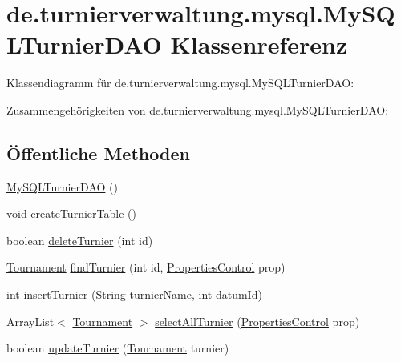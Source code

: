 \hypertarget{classde_1_1turnierverwaltung_1_1mysql_1_1_my_s_q_l_turnier_d_a_o}{}\section{de.\+turnierverwaltung.\+mysql.\+My\+S\+Q\+L\+Turnier\+D\+AO Klassenreferenz}
\label{classde_1_1turnierverwaltung_1_1mysql_1_1_my_s_q_l_turnier_d_a_o}


Klassendiagramm für de.\+turnierverwaltung.\+mysql.\+My\+S\+Q\+L\+Turnier\+D\+AO\+:


Zusammengehörigkeiten von de.\+turnierverwaltung.\+mysql.\+My\+S\+Q\+L\+Turnier\+D\+AO\+:
\subsection*{Öffentliche Methoden}
\begin{DoxyCompactItemize}
\item 
\hyperlink{classde_1_1turnierverwaltung_1_1mysql_1_1_my_s_q_l_turnier_d_a_o_a7ce6e55341d08923233e23a51085e854}{My\+S\+Q\+L\+Turnier\+D\+AO} ()
\item 
void \hyperlink{classde_1_1turnierverwaltung_1_1mysql_1_1_my_s_q_l_turnier_d_a_o_a453121755c3f43e502c0245ece4085ca}{create\+Turnier\+Table} ()
\item 
boolean \hyperlink{classde_1_1turnierverwaltung_1_1mysql_1_1_my_s_q_l_turnier_d_a_o_a15a4917269636ac58e5228d384f67ba5}{delete\+Turnier} (int id)
\item 
\hyperlink{classde_1_1turnierverwaltung_1_1model_1_1_tournament}{Tournament} \hyperlink{classde_1_1turnierverwaltung_1_1mysql_1_1_my_s_q_l_turnier_d_a_o_ae2eda2176964852742ee104462a895a8}{find\+Turnier} (int id, \hyperlink{classde_1_1turnierverwaltung_1_1control_1_1_properties_control}{Properties\+Control} prop)
\item 
int \hyperlink{classde_1_1turnierverwaltung_1_1mysql_1_1_my_s_q_l_turnier_d_a_o_af2755099486832444fc54f9deaffa96d}{insert\+Turnier} (String turnier\+Name, int datum\+Id)
\item 
Array\+List$<$ \hyperlink{classde_1_1turnierverwaltung_1_1model_1_1_tournament}{Tournament} $>$ \hyperlink{classde_1_1turnierverwaltung_1_1mysql_1_1_my_s_q_l_turnier_d_a_o_a2c69011060b143c1f355420147e57fae}{select\+All\+Turnier} (\hyperlink{classde_1_1turnierverwaltung_1_1control_1_1_properties_control}{Properties\+Control} prop)
\item 
boolean \hyperlink{classde_1_1turnierverwaltung_1_1mysql_1_1_my_s_q_l_turnier_d_a_o_a12c3b6e3dbb7a7b5a01b9ffb70d0c281}{update\+Turnier} (\hyperlink{classde_1_1turnierverwaltung_1_1model_1_1_tournament}{Tournament} turnier)
\end{DoxyCompactItemize}


